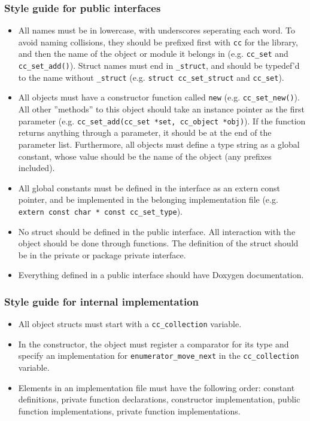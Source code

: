 \documentclass[11pt, letterpaper, twoside, openright]{book}
\begin{document}
    \subsubsection{Style guide for public interfaces}

      \begin{itemize}
        \item All names must be in lowercase, with underscores seperating each word. To avoid naming collisions, they should be prefixed first with \texttt{cc} for the library, and then the name of the object or module it belongs in (e.g. \texttt{cc\_set} and \texttt{cc\_set\_add()}). Struct names must end in \texttt{\_struct}, and should be typedef'd to the name without \texttt{\_struct} (e.g. \texttt{struct cc\_set\_struct} and \texttt{cc\_set}).
        \item All objects must have a constructor function called \texttt{new} (e.g. \texttt{cc\_set\_new()}). All other ''methods'' to this object should take an instance pointer as the first parameter (e.g. \texttt{cc\_set\_add(cc\_set *set, cc\_object *obj)}). If the function returns anything through a parameter, it should be at the end of the parameter list. Furthermore, all objects must define a type string as a global constant, whose value should be the name of the object (any prefixes included).
        \item All global constants must be defined in the interface as an extern const pointer, and be implemented in the belonging implementation file (e.g. \texttt{extern const char * const cc\_set\_type}).
        \item No struct should be defined in the public interface. All interaction with the object should be done through functions. The definition of the struct should be in the private or package private interface.
        \item Everything defined in a public interface should have Doxygen documentation.
      \end{itemize}

    \subsubsection{Style guide for internal implementation}

      \begin{itemize}
        \item All object structs must start with a \texttt{cc\_collection} variable.
        \item In the constructor, the object must register a comparator for its type and specify an implementation for \texttt{enumerator\_move\_next} in the \texttt{cc\_collection} variable.
        \item Elements in an implementation file must have the following order: constant definitions, private function declarations, constructor implementation, public function implementations, private function implementations.
      \end{itemize}
\end{document}
